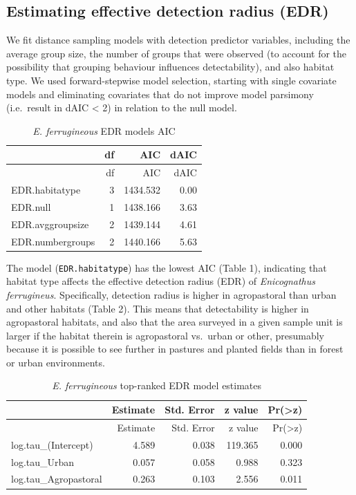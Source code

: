 \documentclass[]{article}
\begin{document}
\subsection{Estimating effective detection radius
(EDR)}\label{estimating-effective-detection-radius-edr}

We fit distance sampling models with detection predictor variables,
including the average group size, the number of groups that were
observed (to account for the possibility that grouping behaviour
influences detectability), and also habitat type. We used
forward-stepwise model selection, starting with single covariate models
and eliminating covariates that do not improve model parsimony
(i.e.~result in dAIC \textless{} 2) in relation to the null model.

\begin{longtable}[]{@{}lrrr@{}}
\caption{\textit{E. ferrugineous} EDR models AIC}\tabularnewline
\toprule
& df & AIC & dAIC\tabularnewline
\midrule
\endfirsthead
\toprule
& df & AIC & dAIC\tabularnewline
\midrule
\endhead
EDR.habitatype & 3 & 1434.532 & 0.00\tabularnewline
EDR.null & 1 & 1438.166 & 3.63\tabularnewline
EDR.avggroupsize & 2 & 1439.144 & 4.61\tabularnewline
EDR.numbergroups & 2 & 1440.166 & 5.63\tabularnewline
\bottomrule
\end{longtable}

The model (\texttt{EDR.habitatype}) has the lowest AIC (Table 1),
indicating that habitat type affects the effective detection radius
(EDR) of \emph{Enicognathus ferrugineus}. Specifically, detection radius
is higher in agropastoral than urban and other habitats (Table 2). This
means that detectability is higher in agropastoral habitats, and also
that the area surveyed in a given sample unit is larger if the habitat
therein is agropastoral vs.~urban or other, presumably because it is
possible to see further in pastures and planted fields than in forest or
urban environments.

\begin{longtable}[]{@{}lrrrr@{}}
\caption{\textit{E. ferrugineous} top-ranked EDR model
estimates}\tabularnewline
\toprule
& Estimate & Std. Error & z value &
Pr(\textgreater{}\textbar{}z\textbar{})\tabularnewline
\midrule
\endfirsthead
\toprule
& Estimate & Std. Error & z value &
Pr(\textgreater{}\textbar{}z\textbar{})\tabularnewline
\midrule
\endhead
log.tau\_(Intercept) & 4.589 & 0.038 & 119.365 & 0.000\tabularnewline
log.tau\_Urban & 0.057 & 0.058 & 0.988 & 0.323\tabularnewline
log.tau\_Agropastoral & 0.263 & 0.103 & 2.556 & 0.011\tabularnewline
\bottomrule
\end{longtable}
\end{document}
